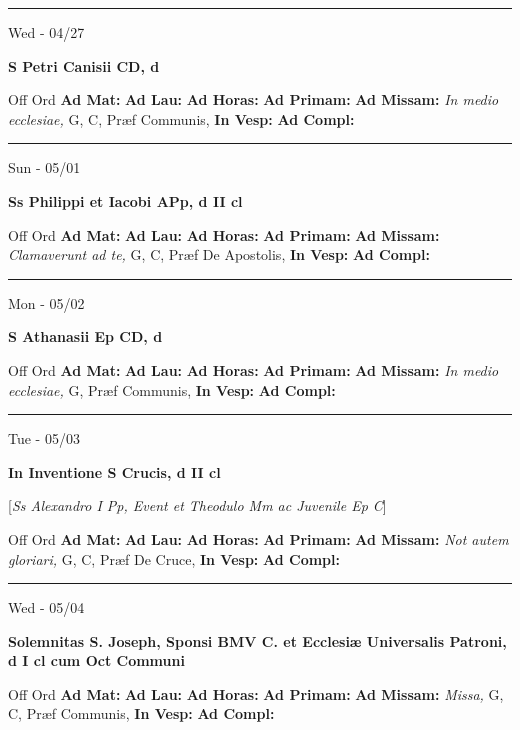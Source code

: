 \documentclass[letterpaper, 10pt]{article}
\begin{document}
\hrule
\begin{center}
Wed - 04/27
\end{center}\textbf{ \large S Petri Canisii CD, \textnormal{\normalsize d}}
\begin{justify}
Off Ord
\textbf{Ad Mat: }
\textbf{Ad Lau: }
\textbf{Ad Horas: }
\textbf{Ad Primam: }
\textbf{Ad Missam:} \textit{In medio ecclesiae, } G, C, Præf Communis, 
\textbf{In Vesp: }
\textbf{Ad Compl: }\end{justify}



\hrule
\begin{center}
Sun - 05/01
\end{center}\textbf{ \large Ss Philippi et Iacobi APp, \textnormal{\normalsize d II cl}}
\begin{justify}
Off Ord
\textbf{Ad Mat: }
\textbf{Ad Lau: }
\textbf{Ad Horas: }
\textbf{Ad Primam: }
\textbf{Ad Missam:} \textit{Clamaverunt ad te, } G, C, Præf De Apostolis, 
\textbf{In Vesp: }
\textbf{Ad Compl: }\end{justify}



\hrule
\begin{center}
Mon - 05/02
\end{center}\textbf{ \large S Athanasii Ep CD, \textnormal{\normalsize d}}
\begin{justify}
Off Ord
\textbf{Ad Mat: }
\textbf{Ad Lau: }
\textbf{Ad Horas: }
\textbf{Ad Primam: }
\textbf{Ad Missam:} \textit{In medio ecclesiae, } G, Præf Communis, 
\textbf{In Vesp: }
\textbf{Ad Compl: }\end{justify}



\hrule
\begin{center}
Tue - 05/03
\end{center}\textbf{ \large In Inventione S Crucis, \textnormal{\normalsize d II cl}}

[\textit{Ss Alexandro I Pp, Event et Theodulo Mm ac Juvenile Ep C}]
\begin{justify}
Off Ord
\textbf{Ad Mat: }
\textbf{Ad Lau: }
\textbf{Ad Horas: }
\textbf{Ad Primam: }
\textbf{Ad Missam:} \textit{Not autem gloriari, } G, C, Præf De Cruce, 
\textbf{In Vesp: }
\textbf{Ad Compl: }\end{justify}



\hrule
\begin{center}
Wed - 05/04
\end{center}\textbf{ \large Solemnitas S. Joseph, Sponsi BMV C. et Ecclesiæ Universalis Patroni, \textnormal{\normalsize d I cl cum Oct Communi}}
\begin{justify}
Off Ord
\textbf{Ad Mat: }
\textbf{Ad Lau: }
\textbf{Ad Horas: }
\textbf{Ad Primam: }
\textbf{Ad Missam:} \textit{Missa, } G, C, Præf Communis, 
\textbf{In Vesp: }
\textbf{Ad Compl: }\end{justify}
\end{document}
